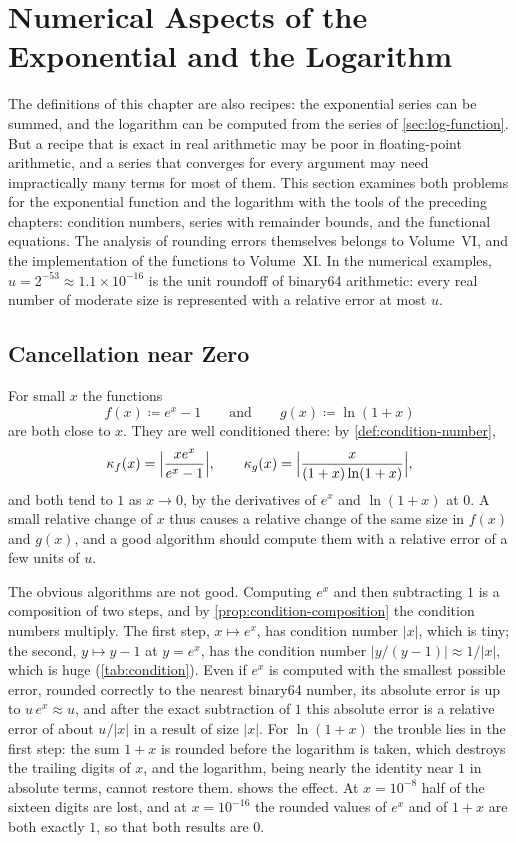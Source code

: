 \section{Numerical Aspects of the Exponential and the Logarithm}
\label{sec:exp-log-numerics}

The definitions of this chapter are also recipes: the exponential series can be summed, and the logarithm can be computed from the series of \cref{sec:log-function}. But a recipe that is exact in real arithmetic may be poor in floating-point arithmetic, and a series that converges for every argument may need impractically many terms for most of them. This section examines both problems for the exponential function and the logarithm with the tools of the preceding chapters: condition numbers, series with remainder bounds, and the functional equations. The analysis of rounding errors themselves belongs to Volume~VI, and the implementation of the functions to Volume~XI. In the numerical examples, $u=2^{-53}\approx1.1\times10^{-16}$ is the unit roundoff of binary64 arithmetic: every real number of moderate size is represented with a relative error at most $u$.

\subsection{Cancellation near Zero}

For small $x$ the functions
\[
f(x)\coloneqq e^x-1\qquad\text{and}\qquad g(x)\coloneqq\ln(1+x)
\]
are both close to $x$. They are well conditioned there: by \cref{def:condition-number},
\[
\kappa_f(x)=\Bigl|\frac{xe^x}{e^x-1}\Bigr|,\qquad\kappa_g(x)=\Bigl|\frac x{(1+x)\ln(1+x)}\Bigr|,
\]
and both tend to $1$ as $x\to0$, by the derivatives of $e^x$ and $\ln(1+x)$ at $0$. A small relative change of $x$ thus causes a relative change of the same size in $f(x)$ and $g(x)$, and a good algorithm should compute them with a relative error of a few units of $u$.

The obvious algorithms are not good. Computing $e^x$ and then subtracting $1$ is a composition of two steps, and by \cref{prop:condition-composition} the condition numbers multiply. The first step, $x\mapsto e^x$, has condition number $|x|$, which is tiny; the second, $y\mapsto y-1$ at $y=e^x$, has the condition number $|y/(y-1)|\approx1/|x|$, which is huge (\cref{tab:condition}). Even if $e^x$ is computed with the smallest possible error, rounded correctly to the nearest binary64 number, its absolute error is up to $u\,e^x\approx u$, and after the exact subtraction of $1$ this absolute error is a relative error of about $u/|x|$ in a result of size $|x|$. For $\ln(1+x)$ the trouble lies in the first step: the sum $1+x$ is rounded before the logarithm is taken, which destroys the trailing digits of $x$, and the logarithm, being nearly the identity near $1$ in absolute terms, cannot restore them.  shows the effect. At $x=10^{-8}$ half of the sixteen digits are lost, and at $x=10^{-16}$ the rounded values of $e^x$ and of $1+x$ are both exactly $1$, so that both results are $0$.

